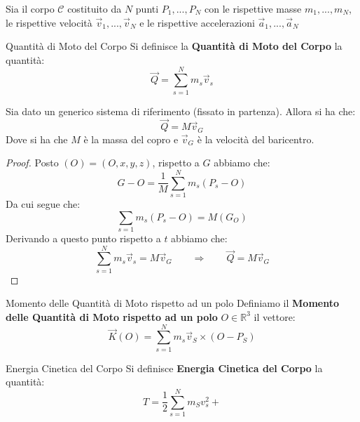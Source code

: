 \documentclass[11pt,a4paper,twoside]{article}
\theoremstyle{definition}
\begin{document}
Sia il corpo $\mathscr C$ costituito da $N$ punti $P_1,...,P_N$ con le rispettive masse $m_1,...,m_N$, le rispettive velocità $\vec v_1,...,\vec v_N$ e le rispettive accelerazioni $\vec a_1,...,\vec a_N$

\begin{defn}{Quantità di Moto del Corpo}{}
	Si definisce la \textbf{Quantità di Moto del Corpo} la quantità:
	\[ \vec Q = \sum_{s = 1}^N m_s \vec v_s \]
\end{defn}

\begin{prop}{}{}
	Sia dato un generico sistema di riferimento (fissato in partenza). Allora si ha che:
	\[ \vec Q = M\vec v_G \]
	Dove si ha che $M$ è la massa del copro e $\vec v_G$ è la velocità del baricentro.
\end{prop}
\begin{proof}
	Posto $(O) = (O,x,y,z)$, rispetto a $G$ abbiamo che:
	\[ G-O = \frac 1M \sum_{s = 1}^N m_s(P_s-O) \]
	Da cui segue che:
	\[ \sum_{s = 1} m_s(P_s - O) = M(G_O) \]
	Derivando a questo punto rispetto a $t$ abbiamo che:
	\[ \sum_{s = 1}^N m_s \vec v_s = M\vec v_G \qquad \Rightarrow \qquad \vec Q = M \vec v_G \]
\end{proof}

\begin{defn}{Momento delle Quantità di Moto rispetto ad un polo}{}
	Definiamo il \textbf{Momento delle Quantità di Moto rispetto ad un polo} $O \in \mathbb R^3$ il vettore:
	\[ \vec K(O) = \sum_{s = 1}^N m_s \vec v_S \times (O-P_S) \]
\end{defn}

\begin{defn}{Energia Cinetica del Corpo}{}
	Si definisce \textbf{Energia Cinetica del Corpo} la quantità:
	\[ T = \frac 12 \sum_{s = 1}^N m_Sv_s^2 + \]
\end{defn}
\end{document}
